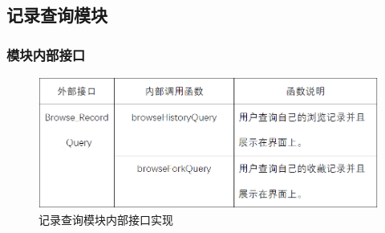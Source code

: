 \subsection{记录查询模块}
\subsubsection{模块内部接口}
\begin{figure}[!htbp]
	\centering
	\includegraphics[scale=0.75]{image/b10.png} %
	\caption{记录查询模块内部接口实现} %
\end{figure}
